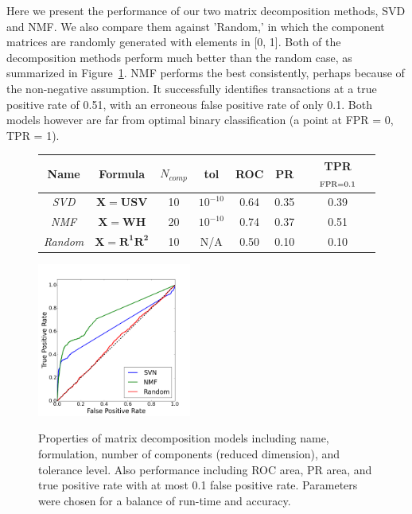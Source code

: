 \documentclass{article} %
\begin{document}
Here we present the performance of our two matrix decomposition methods, SVD and NMF. We also compare them against 'Random,' in which the component matrices are randomly generated with elements in [0, 1]. Both of the decomposition methods perform much better than the random case, as summarized in Figure~\ref{fig:matrix}. NMF performs the best consistently, perhaps because of the non-negative assumption. It successfully identifies transactions at a true positive rate of 0.51, with an erroneous false positive rate of only 0.1. Both models however are far from optimal binary classification (a point at FPR = 0, TPR = 1). 
\begin{figure}[!h]

\begin{minipage}[b]{0.45\linewidth}
\centering

\begin{footnotesize}
\setlength{\tabcolsep}{4pt}
\renewcommand{\arraystretch}{2.85}
\begin{tabular}[b]{c c c c | c c c}
    \hline
    Name & Formula & $N_{comp}$ & tol & ROC & PR & TPR$_{{\rm FPR = } 0.1}$\\
    \hline
    {\it SVD} & $\mathbf{ X = USV}$ & 10 & $10^{-10}$ & 0.64 & 0.35 & 0.39 \\
    {\it NMF} & $\mathbf{ X = WH}$ & 20 & $10^{-10}$ & 0.74 & 0.37 & 0.51 \\
    {\it Random} & $\mathbf{ X = R^{1}R^{2}}$ & 10 & N/A & 0.50 & 0.10 & 0.10 \\
    \hline
\end{tabular}
\end{footnotesize}

\end{minipage}
\begin{minipage}[b]{0.8\linewidth}


\centering
  \includegraphics[width=0.45\textwidth]{ROC.png}
  \label{fig:roc}
\end{minipage}

\caption{Properties of matrix decomposition models including name, formulation, number of components (reduced dimension), and tolerance level. Also performance including ROC area, PR area, and true positive rate with at most 0.1 false positive rate. Parameters were chosen for a balance of run-time and accuracy.}
\label{fig:matrix}
\end{figure}
\end{document}
